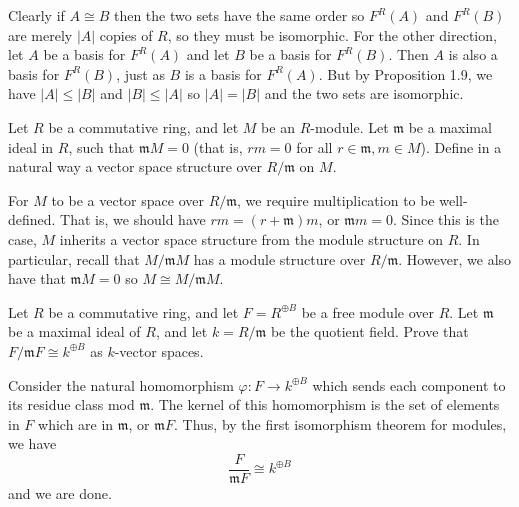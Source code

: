 \documentclass[../../master.tex]{subfiles}
\begin{document}
\begin{solution}
    Clearly if $A \cong B$ then the two sets have the same order so $F^{R}(A)$ and $F^{R}(B)$ are merely $|A|$ copies of $R$, so they must be isomorphic.
    For the other direction, let $A$ be a basis for $F^{R}(A)$ and let $B$ be a basis for $F^{R}(B)$.
    Then $A$ is also a basis for $F^{R}(B)$, just as $B$ is a basis for $F^{R}(A)$.
    But by Proposition 1.9, we have $|A| \leq |B|$ and $|B| \leq |A|$ so $|A| = |B|$ and the two sets are isomorphic.
\end{solution}

\begin{problem}
    Let $R$ be a commutative ring, and let $M$ be an $R$-module.
    Let $\mathfrak{m}$ be a maximal ideal in $R$, such that $\mathfrak{m}M = 0$ 
    (that is, $rm = 0$ for all $r \in \mathfrak{m}, m \in M$).
    Define in a natural way a vector space structure over $R / \mathfrak{m}$ on $M$.
\end{problem}

\begin{solution}
    For $M$ to be a vector space over $R / \mathfrak{m}$, we require multiplication to be well-defined.
    That is, we should have $rm = (r + \mathfrak{m}) m$, or $\mathfrak{m} m = 0$.
    Since this is the case, $M$ inherits a vector space structure from the module structure on $R$.
    In particular, recall that $M / \mathfrak{m} M$ has a module structure over $R / \mathfrak{m}$.
    However, we also have that $\mathfrak{m} M = 0$ so $M \cong M / \mathfrak{m} M$.
\end{solution}

\begin{problem}
    Let $R$ be a commutative ring, and let $F = R^{\oplus B}$ be a free module over $R$.
    Let $\mathfrak{m}$ be a maximal ideal of $R$, and let $k = R / \mathfrak{m}$ be the quotient field.
    Prove that $F / \mathfrak{m}F \cong k^{\oplus B}$ as $k$-vector spaces.
\end{problem}

\begin{solution}
    Consider the natural homomorphism $\varphi : F \to k^{\oplus B}$ which sends each component to its residue class mod $\mathfrak{m}$.
    The kernel of this homomorphism is the set of elements in $F$ which are in $\mathfrak{m}$, or $\mathfrak{m}F$.
    Thus, by the first isomorphism theorem for modules, we have
    \[
        \frac{F}{\mathfrak{m} F} \cong k^{\oplus B}
    \]
    and we are done.
\end{solution}
\end{document}
